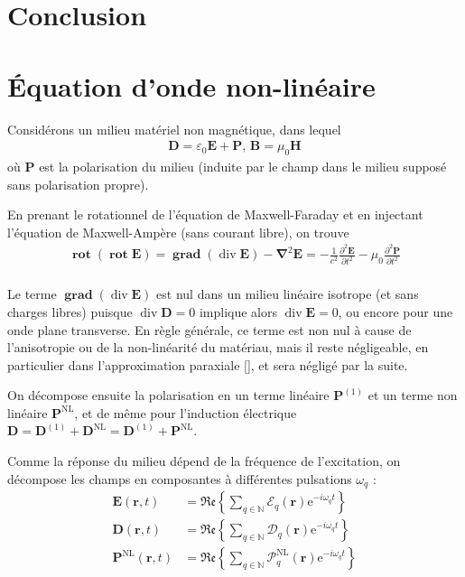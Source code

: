 \documentclass[11pt,a4paper] { article}
\newcommand{\ncite}[1]{[\citenum{#1}]}
\DeclareMathOperator{\divg}{div}
\DeclareMathOperator{\rot}{\mathbf{rot}}
\DeclareMathOperator{\grad}{\mathbf{grad}}
\newcommand{\e}[1]{\text{e}^{#1}}
\newcommand{\mathsc}[1]{\mathrm{\scriptscriptstyle {#1}}}
\renewcommand{\v}[1]{\boldsymbol{\mathbf{#1}}}
\begin{document}
\section{Conclusion}




\newpage

\appendix
\section{\'Equation d'onde non-linéaire}  
\label{NL}
Considérons un milieu matériel non magnétique, dans lequel
\begin{align*}
	\v D = \varepsilon_0 \v E + \v P \text{, } \v B = \mu_0 \v H
\end{align*}
où $\v P$ est la polarisation du milieu (induite par le champ dans le milieu supposé sans polarisation propre).

En prenant le rotationnel de l'équation de Maxwell-Faraday et en injectant l'équation de Maxwell-Ampère (sans courant libre), on trouve
\begin{align*}
	\rot (\rot \v E) = \grad (\divg \v E) - \v \nabla^2 \v E = - \frac{1}{c^2} \frac{\partial^2 \v E}{\partial t^2} - \mu_0 \frac{\partial^2 \v P}{\partial t^2} \\
\end{align*}

Le terme $\grad (\divg \v E)$ est nul dans un milieu linéaire isotrope (et sans charges libres) puisque $\divg \v D=0$ implique alors $\divg \v E = 0$, ou encore pour une onde plane transverse. En règle générale, ce terme est non nul à cause de l'anisotropie ou de la non-linéarité du matériau, mais il reste négligeable, en particulier dans l'approximation paraxiale \ncite{boyd}, et sera négligé par la suite.



On décompose ensuite la polarisation en un terme linéaire $\v P^\mathsc{(1)}$ et un terme non linéaire $\v P^\mathsc{NL}$, et de même pour l'induction électrique $\v D = \v D^\mathsc{(1)} + \v D^\mathsc{NL} = \v D^\mathsc{(1)} + \v P^\mathsc{NL}$. 

Comme la réponse du milieu dépend de la fréquence de l'excitation, on décompose les champs en composantes à différentes pulsations $\omega_q$ :
\begin{align*}
	\v E(\v r, t) &= \mathfrak{Re} \left\{ \sum_{q \in \mathbb N} \v {\boldsymbol{\mathcal E}}_q (\v r) \e{-i \omega_q t} \right\} \\
	\v D(\v r, t) &= \mathfrak{Re} \left\{ \sum_{q \in \mathbb N} \v {\boldsymbol{\mathcal D}}_q (\v r) \e{-i \omega_q t} \right\} \\
	\v P^\mathsc{NL}(\v r, t) &= \mathfrak{Re} \left\{ \sum_{q \in \mathbb N} \v {\boldsymbol{\mathcal P}}^\mathsc{NL}_q (\v r) \e{-i \omega_q t} \right\}
\end{align*}
\end{document}
